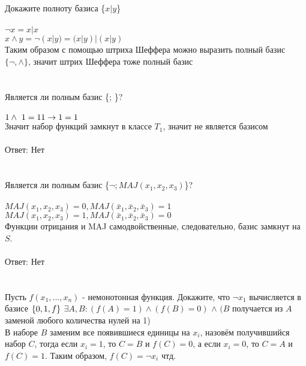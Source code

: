 \documentclass{article}
\begin{document}
\section{}
Докажите полноту базиса \{$x | y$\}\\\\
$\lnot x = x | x$\\
$x \wedge y = \lnot(x | y) = (x | y) | (x | y)$\\
Таким образом с помощью штриха Шеффера можно выразить полный базис $\{\lnot,\wedge\}$, значит штрих Шеффера тоже полный базис
\section{}
Является ли полным базис \{\wedge; \rightarrow\}?\\\\
$1 \wedge\text{ } 1 = 1\\
1 \rightarrow 1 = 1$\\
Значит набор функций замкнут в классе $T_1$, значит не является базисом\\\\
Ответ: Нет
\section{}
Является ли полным базис \{$\lnot; MAJ(x_1,x_2,x_3)$\}?\\\\
$MAJ(x_1,x_2,x_3) = 0, MAJ(\bar x_1,\bar x_2, \bar x_3) = 1$\\
$MAJ(x_1,x_2,x_3)= 1, MAJ(\bar x_1,\bar x_2, \bar x_3) = 0$\\
Функции отрицания и MAJ самодвойственные, следовательно, базис замкнут на $S$.\\\\
Ответ: Нет
\section{}
Пусть $f(x_1,...,x_n)$ - немонотонная функция. Докажите, что $\lnot x_1$ вычисляется в базисе $\{0,1,f\}\\\\$
$\exists A, B: (f(A) = 1) \wedge (f(B) = 0)$ $ \wedge$ $(B$ получается из $A$ заменой любого количества нулей на 1)\\
В наборе $B$ заменим все появившиеся единицы на $x_i$, назовём получившийся набор $C$, тогда если $x_i=1$, то $C=B$ и $f(C)=0$, а если $x_i=0$, то $C=A$ и $f(C)=1$. Таким образом, $f(C)=\lnot x_i$ чтд.
\end{document}
